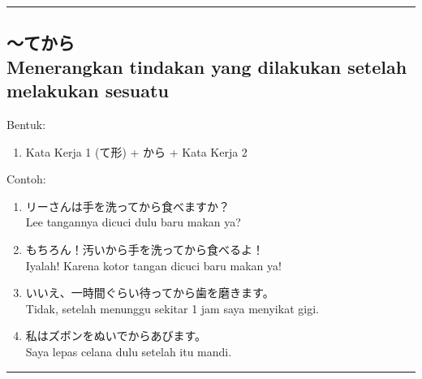 \vspace{0.2cm}\hrule height 1pt\vspace{0.2cm}


\subsection*{
    ～てから \\
    Menerangkan tindakan yang dilakukan setelah melakukan sesuatu
}
Bentuk:
\begin{enumerate}
    \item Kata Kerja 1 (て形) + から + Kata Kerja 2
\end{enumerate}
Contoh: 
\begin{enumerate}
    \item リーさんは手を洗ってから食べますか？
    \\ Lee tangannya dicuci dulu baru makan ya?
    \item もちろん！汚いから手を洗ってから食べるよ！
    \\ Iyalah! Karena kotor tangan dicuci baru makan ya!
    \item いいえ、一時間ぐらい待ってから歯を磨きます。
    \\ Tidak, setelah menunggu sekitar 1 jam saya menyikat gigi.
    \item 私はズボンをぬいでからあびます。
    \\ Saya lepas celana dulu setelah itu mandi.
\end{enumerate}

\vspace{0.2cm}\hrule height 1pt\vspace{0.2cm}

\newpage
